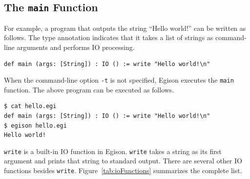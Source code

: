 \subsection{The \texttt{main} Function}

For example, a program that outputs the string ``Hello world!'' can be written as follows.
The type annotation indicates that it takes a list of strings as command-line arguments and performs IO processing.
\begin{lstlisting}[language=egison,numbers=none]
def main (args: [String]) : IO () := write "Hello world!\n"
\end{lstlisting}
When the command-line option \lstinline{-t} is not specified, Egison executes the \lstinline{main} function.
The above program can be executed as follows.
\begin{lstlisting}[language=egison,numbers=none]
$ cat hello.egi
def main (args: [String]) : IO () := write "Hello world!\n"
$ egison hello.egi
Hello world!
\end{lstlisting}
\lstinline{write} is a built-in IO function in Egison.
\lstinline{write} takes a string as its first argument and prints that string to standard output.
There are several other IO functions besides \lstinline{write}.
Figure~\ref{tab:ioFunctions} summarizes the complete list.

